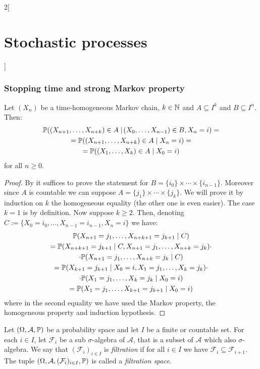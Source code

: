\documentclass[../../../main_math.tex]{subfiles}
\begin{document}
\begin{multicols}{2}[\section{Stochastic processes}]
  \subsubsection{Stopping time and strong Markov property}
  \begin{proposition}\label{SP:MarkovImproved}
    Let $(X_n)$ be a time-homogeneous Markov chain, $k\in\mathbb{N}$ and $A\subseteq I^k$ and $B\subseteq I^n$. Then:
    \begin{multline*}
      \mathbb{P}((X_{n+1},\ldots,X_{n+k})\in A\mid\!(X_0,\ldots,X_{n-1})\in B,X_n=i)=\\
      =\mathbb{P}((X_{n+1},\ldots,X_{n+k})\in A\mid X_n=i)=\\
      =\mathbb{P}((X_{1},\ldots,X_{k})\in A\mid X_0=i)
    \end{multline*}
    for all $n\geq 0$.
  \end{proposition}
  \begin{proof}
    By  it suffices to prove the statement for $B=\{i_0\}\times\cdots\times\{i_{n-1}\}$. Moreover since $A$ is countable we can suppose $A=\{j_1\}\times\cdots\times\{j_k\}$. We will prove it by induction on $k$ the homogeneous equality (the other one is even easier). The case $k=1$ is by definition. Now suppose $k\geq 2$. Then, denoting $C:=\{X_0=i_0,\ldots,X_{n-1}=i_{n-1},X_n=i\}$ we have:
    \begin{multline*}
      \mathbb{P}(X_{n+1}=j_1,\ldots,X_{n+k+1}=j_{k+1}\mid C) \\
      =\mathbb{P}(X_{n+k+1}=j_{k+1}\mid C,X_{n+1}=j_1,\ldots,X_{n+k}=j_k)\cdot\\
      \cdot\mathbb{P}(X_{n+1}=j_1,\ldots,X_{n+k}=j_k\mid C) \\
      =\mathbb{P}(X_{k+1}=j_{k+1}\mid X_0=i,X_{1}=j_1,\ldots,X_{k}=j_k)\cdot\\
      \cdot\mathbb{P}(X_{1}=j_1,\ldots,X_{k}=j_k\mid X_0=i) \\
      =\mathbb{P}(X_{1}=j_1,\ldots,X_{k+1}=j_{k+1}\mid X_0=i)
    \end{multline*}
    where in the second equality we have used the Markov property, the homogeneous property and induction hypothesis.
  \end{proof}
  \begin{definition}
    Let $(\Omega,\mathcal{A},\mathbb{P})$ be a probability space and let $I$ be a finite or countable set. For each $i\in I$, let $\mathcal{F}_i$ be a sub $\sigma$-algebra of $\mathcal{A}$, that is a subset of $\mathcal{A}$ which also $\sigma$-algebra. We say that $(\mathcal{F}_i)_{i\in I}$ is \emph{filtration} if for all $i\in I$ we have $\mathcal{F}_i\subseteq\mathcal{F}_{i+1}$. The tuple $(\Omega,\mathcal{A},(\mathcal{F}_i)_{i\in I},\mathbb{P})$ is called a \emph{filtration space}.

\end{definition}
\end{multicols}
\end{document}
